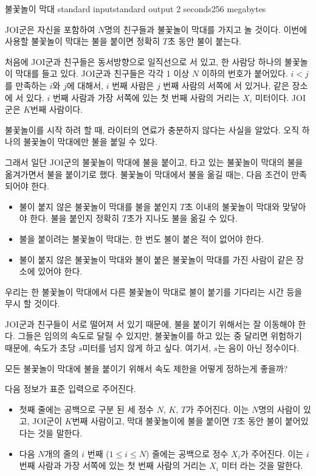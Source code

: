 \begin{problem}{불꽃놀이 막대}
	{standard input}{standard output}
	{2 seconds}{256 megabytes}{}
	
	JOI군은 자신을 포함하여 $N$명의 친구들과 불꽃놀이 막대를 가지고 놀 것이다. 이번에 사용할 불꽃놀이 막대는 불을 붙이면 정확히 $T$초 동안 불이 붙는다.
	
	처음에 JOI군과 친구들은 동서방향으로 일직선으로 서 있고, 한 사람당 하나의 불꽃놀이 막대를 들고 있다. JOI군과 친구들은 각각 1 이상 $N$ 이하의 번호가 붙어있다. $i<j$를 만족하는 $i$와 $j$에 대해서, $i$ 번째 사람은 $j$ 번째 사람의 서쪽에 서 있거나, 같은 장소에 서 있다. $i$ 번째 사람과 가장 서쪽에 있는 첫 번째 사람의 거리는 $X_i$ 미터이다. JOI군은 $K$번째 사람이다.
	
	불꽃놀이를 시작 하려 할 때, 라이터의 연료가 충분하지 않다는 사실을 알았다. 오직 하나의 불꽃놀이 막대에만 불을 붙일 수 있다.
	
	그래서 일단 JOI군의 불꽃놀이 막대에 불을 붙이고, 타고 있는 불꽃놀이 막대의 불을 옮겨가면서 불을 붙이기로 했다. 불꽃놀이 막대에서 불을 옮길 때는, 다음 조건이 만족되어야 한다.
	
	\begin{itemize}
		\item 불이 붙지 않은 불꽃놀이 막대를 불을 붙인지 $T$초 이내의 불꽃놀이 막대와 맞닿아야 한다. 불을 붙인지 정확히 $T$초가 지나도 불을 옮길 수 있다.
		\item 불을 붙이려는 불꽃놀이 막대는, 한 번도 불이 붙은 적이 없어야 한다.
		\item 불이 붙지 않은 불꽃놀이 막대와 불이 붙은 불꽃놀이 막대를 가진 사람이 같은 장소에 있어야 한다.
	\end{itemize}
	
	우리는 한 불꽃놀이 막대에서 다른 불꽃놀이 막대로 불이 붙기를 기다리는 시간 등을 무시 할 것이다.
	
	JOI군과 친구들이 서로 떨어져 서 있기 때문에, 불을 붙이기 위해서는 잘 이동해야 한다. 그들은 임의의 속도로 달릴 수 있지만, 불꽃놀이를 하고 있는 중 달리면 위험하기 때문에, 속도가 초당 $s$미터를 넘지 않게 하고 싶다. 여기서, $s$는 음이 아닌 정수이다.
	
	모든 불꽃놀이 막대에 불을 붙이기 위해서 속도 제한을 어떻게 정하는게 좋을까?
	
	\InputFile
	
	다음 정보가 표준 입력으로 주어진다.
	
	\begin{itemize}
		\item 첫째 줄에는 공백으로 구분 된 세 정수 $N$, $K$, $T$가 주어진다. 이는 $N$명의 사람이 있고, JOI군이 $K$번째 사람이고, 막대 불꽃놀이에 불을 붙이면 $T$초 동안 불이 붙어있다는 것을 말한다. 
		\item 다음 $N$개의 줄의 $i$ 번째 ($1 \le i \le N$) 줄에는 공백으로 정수 $X_i$가 주어진다. 이는 $i$ 번째 사람과 가장 서쪽에 있는 첫 번째 사람의 거리는 $X_i$ 미터 라는 것을 말한다.
	\end{itemize}
	

\end{problem}
